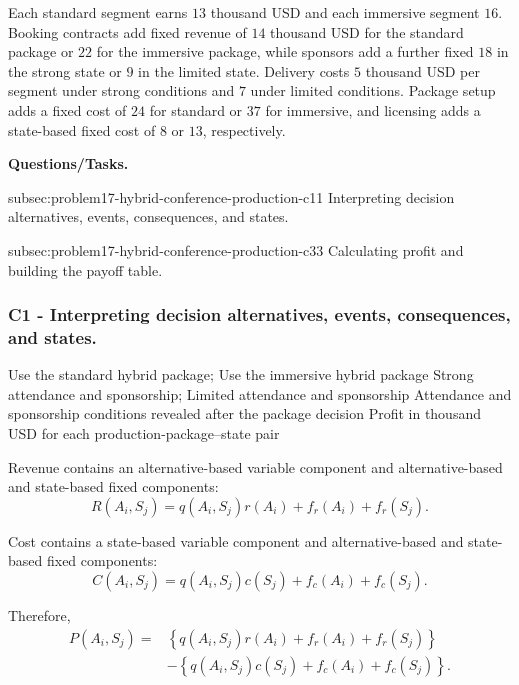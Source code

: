 	Each standard segment earns \(13\) thousand USD and each immersive segment \(16\). Booking contracts add fixed revenue of \(14\) thousand USD for the standard package or \(22\) for the immersive package, while sponsors add a further fixed \(18\) in the strong state or \(9\) in the limited state. Delivery costs \(5\) thousand USD per segment under strong conditions and \(7\) under limited conditions. Package setup adds a fixed cost of \(24\) for standard or \(37\) for immersive, and licensing adds a state-based fixed cost of \(8\) or \(13\), respectively.

	\textbf{Questions/Tasks.}
	\begin{enumerate}
		\CriterionTask
		{subsec:problem17-hybrid-conference-production-c1}{1}
		{Interpreting decision alternatives, events, consequences, and states.}

		\CriterionTask
		{subsec:problem17-hybrid-conference-production-c3}{3}
		{Calculating profit and building the payoff table.}
	\end{enumerate}

	\subsubsection*{C1 - Interpreting decision alternatives, events, consequences, and states.}
	\label{subsec:problem17-hybrid-conference-production-c1}

	\DecisionElementsTable
	{Use the standard hybrid package; Use the immersive hybrid package}
	{Strong attendance and sponsorship; Limited attendance and sponsorship}
	{Attendance and sponsorship conditions revealed after the package decision}
	{Profit in thousand USD for each production-package--state pair}

	Revenue contains an alternative-based variable component and
	alternative-based and state-based fixed components:
	\[
	R(A_i,S_j)
	=
	q(A_i,S_j)r(A_i)
	+
	f_r(A_i)
	+
	f_r(S_j).
	\]

	Cost contains a state-based variable component and alternative-based and
	state-based fixed components:
	\[
	C(A_i,S_j)
	=
	q(A_i,S_j)c(S_j)
	+
	f_c(A_i)
	+
	f_c(S_j).
	\]

	Therefore,
	\[
	\begin{aligned}
		P(A_i,S_j)
		={}&
		\left\{
		q(A_i,S_j)r(A_i)
		+
		f_r(A_i)
		+
		f_r(S_j)
		\right\}
		\\
		&-
		\left\{
		q(A_i,S_j)c(S_j)
		+
		f_c(A_i)
		+
		f_c(S_j)
		\right\}.
	\end{aligned}
	\]

